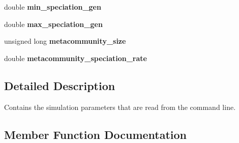 \begin{DoxyCompactItemize}
\item 
double {\bfseries min\+\_\+speciation\+\_\+gen}\hypertarget{struct_spec_sim_parameters_a386648731706431c9972b76faa2ba7ec}{}\label{struct_spec_sim_parameters_a386648731706431c9972b76faa2ba7ec}

\item 
double {\bfseries max\+\_\+speciation\+\_\+gen}\hypertarget{struct_spec_sim_parameters_a1930497f64e7f914b8f93aa1fb2d8bff}{}\label{struct_spec_sim_parameters_a1930497f64e7f914b8f93aa1fb2d8bff}

\item 
unsigned long {\bfseries metacommunity\+\_\+size}\hypertarget{struct_spec_sim_parameters_a5afee22112d2be5b0dc730553e01d2cd}{}\label{struct_spec_sim_parameters_a5afee22112d2be5b0dc730553e01d2cd}

\item 
double {\bfseries metacommunity\+\_\+speciation\+\_\+rate}\hypertarget{struct_spec_sim_parameters_a4aa21c1b3e61729fb6f25d1b5cf38bd2}{}\label{struct_spec_sim_parameters_a4aa21c1b3e61729fb6f25d1b5cf38bd2}

\end{DoxyCompactItemize}


\subsection{Detailed Description}
Contains the simulation parameters that are read from the command line. 

\subsection{Member Function Documentation}
